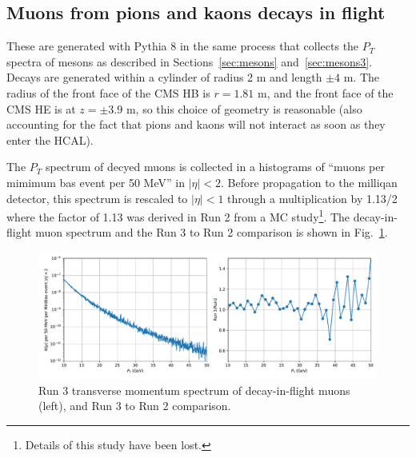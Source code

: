 \documentclass[12pt]{article}
\begin{document}
\subsection{Muons from pions and kaons decays in flight}
\label{sec:decays-in-flight}
These are generated with Pythia 8 in the same process that collects the
$P_T$ spectra of mesons as described in Sections~\ref{sec:mesons} and~\ref{sec:mesons3}.
Decays are generated within a cylinder of radius 2 m and length $\pm 4$ m.
The radius of the front face of the CMS HB is $r=1.81$ m, and the front
face of the CMS HE is at $z = \pm 3.9$ m, so this choice of geometry
is reasonable (also accounting for the fact that pions and kaons will not
interact as soon as they enter the HCAL).

The $P_T$ spectrum of decyed muons is collected in a histograms of
``muons per mimimum bas event per 50 MeV'' in $|\eta|<2$.
Before propagation to the milliqan detector, this spectrum is rescaled to $|\eta|<1$
through a multiplication by 1.13/2 where the factor of 1.13 was
derived in Run 2 from a MC study\footnote{Details of this study have been lost.}.
The decay-in-flight muon spectrum and the Run 3 to Run 2 comparison is
shown in Fig.~\ref{fig:dof_muons}.

\begin{figure}[H]
\includegraphics[width=1.0\linewidth]{../mesonPt/mu_nonbc.pdf}  
\caption{Run 3 transverse momentum spectrum of decay-in-flight
  muons (left), and Run 3 to Run 2 comparison.}
  \label{fig:dof_muons}
\end{figure}
\end{document}
